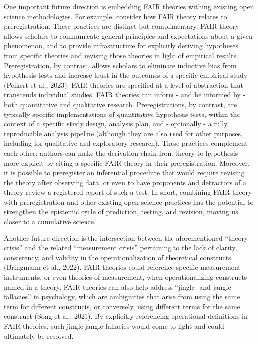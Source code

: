 \documentclass[
  man, noextraspace,floatsintext]{apa7}
\begin{document}
\label{fairtheoryprereg}{One important future direction is embedding FAIR theories withing existing open science methodologies.
For example, consider how FAIR theory relates to preregistration.
These practices are distinct but complimentary.
FAIR theory allows scholars to communicate general principles and expectations about a given phenomenon,
and to provide infrastructure for explicitly deriving hypotheses from specific theories and revising those theories in light of empirical results.
Preregistration, by contrast, allows scholars to eliminate inductive bias from hypothesis tests and increase trust in the outcomes of a specific empirical study (Peikert et al., 2023).
FAIR theories are specified at a level of abstraction that transcends individual studies.
FAIR theories can inform - and be informed by - both quantitative and qualitative research.
Preregistrations, by contrast, are typically specific implementations of quantitative hypothesis tests,
within the context of a specific study design, analysis plan, and - optionally - a fully reproducible analysis pipeline (although they are also used for other purposes, including for qualitative and exploratory research).
These practices complement each other:
authors can make the derivation chain from theory to hypothesis more explicit by citing a specific FAIR theory in their preregistration.
Moreover, it is possible to preregister an inferential procedure that would require revising the theory after observing data,
or even to have proponents and detractors of a theory review a registered report of such a test.
In short, combining FAIR theory with preregistration and other existing open science practices has the potential to strengthen the epistemic cycle of prediction, testing, and revision, moving us closer to a cumulative science.}

\label{measurementcrisis}{Another future direction is the intersection between the aforementioned ``theory crisis'' and the related ``measurement crisis'' pertaining to the lack of clarity, consistency, and validity in the operationalization of theoretical constructs (Bringmann et al., 2022).
FAIR theories could reference specific measurement instruments, or even theories of measurement,
when operationalizing constructs named in a theory.}
\label{jinglejangle}{FAIR theories can also help address ``jingle- and jangle fallacies'' in psychology,
which are ambiguities that arise from using the same term for different constructs, or conversely, using different terms for the same construct (Song et al., 2021).
By explicitly referencing operational definitions in FAIR theories,
such jingle-jangle fallacies would come to light and could ultimately be resolved.}
\end{document}
